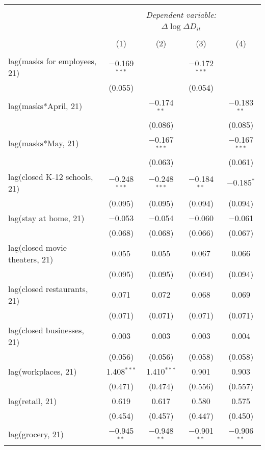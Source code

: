 \begin{tabular}{@{\extracolsep{1pt}}lcccc} 
\\[-1.8ex]\hline 
\hline \\[-1.8ex] 
 & \multicolumn{4}{c}{\textit{Dependent variable:}} \\ 
\cline{2-5} 
 & \multicolumn{4}{c}{$\Delta \log \Delta D_{it}$} \\ 
\\[-1.8ex] & (1) & (2) & (3) & (4)\\ 
\hline \\[-1.8ex] 
 lag(masks for employees, 21) & $-$0.169$^{***}$ &  & $-$0.172$^{***}$ &  \\ 
  & (0.055) &  & (0.054) &  \\ 
  lag(masks*April, 21) &  & $-$0.174$^{**}$ &  & $-$0.183$^{**}$ \\ 
  &  & (0.086) &  & (0.085) \\ 
  lag(masks*May, 21) &  & $-$0.167$^{***}$ &  & $-$0.167$^{***}$ \\ 
  &  & (0.063) &  & (0.061) \\ 
  lag(closed K-12 schools, 21) & $-$0.248$^{***}$ & $-$0.248$^{***}$ & $-$0.184$^{**}$ & $-$0.185$^{*}$ \\ 
  & (0.095) & (0.095) & (0.094) & (0.094) \\ 
  lag(stay at home, 21) & $-$0.053 & $-$0.054 & $-$0.060 & $-$0.061 \\ 
  & (0.068) & (0.068) & (0.066) & (0.067) \\ 
  lag(closed movie theaters, 21) & 0.055 & 0.055 & 0.067 & 0.066 \\ 
  & (0.095) & (0.095) & (0.094) & (0.094) \\ 
  lag(closed restaurants, 21) & 0.071 & 0.072 & 0.068 & 0.069 \\ 
  & (0.071) & (0.071) & (0.071) & (0.071) \\ 
  lag(closed businesses, 21) & 0.003 & 0.003 & 0.003 & 0.004 \\ 
  & (0.056) & (0.056) & (0.058) & (0.058) \\ 
  lag(workplaces, 21) & 1.408$^{***}$ & 1.410$^{***}$ & 0.901 & 0.903 \\ 
  & (0.471) & (0.474) & (0.556) & (0.557) \\ 
  lag(retail, 21) & 0.619 & 0.617 & 0.580 & 0.575 \\ 
  & (0.454) & (0.457) & (0.447) & (0.450) \\ 
  lag(grocery, 21) & $-$0.945$^{**}$ & $-$0.948$^{**}$ & $-$0.901$^{**}$ & $-$0.906$^{**}$ \\ 

\end{tabular}
